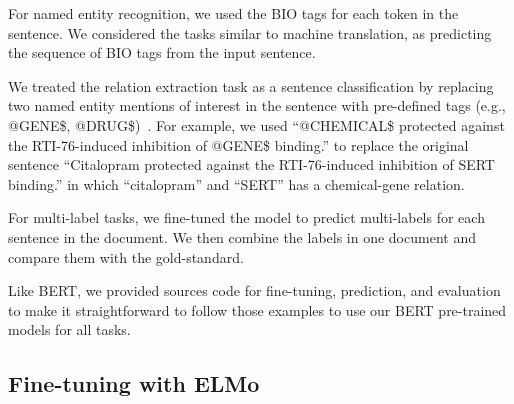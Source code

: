 \documentclass[11pt,a4paper]{article}
\begin{document}
For named entity recognition, we used the BIO tags for each token in the sentence. We considered the tasks similar to machine translation, as predicting the sequence of BIO tags from the input sentence. 

We treated the relation extraction task as a sentence classification by replacing two named entity mentions of interest in the sentence with pre-defined tags (e.g., @GENE\$, @DRUG\$)~\cite{lee2019biobert}. For example, we used ``@CHEMICAL\$ protected against the RTI-76-induced inhibition of @GENE\$ binding.'' to replace the original sentence ``Citalopram protected against the RTI-76-induced inhibition of SERT binding.'' in which ``citalopram'' and ``SERT'' has a chemical-gene relation.

For multi-label tasks, we fine-tuned the model to predict multi-labels for each sentence in the document. We then combine the labels in one document and compare them with the gold-standard.

Like BERT, we provided sources code for fine-tuning, prediction, and evaluation to make it straightforward to follow those examples to use our BERT pre-trained models for all tasks.

\subsection{Fine-tuning with ELMo}
\end{document}
